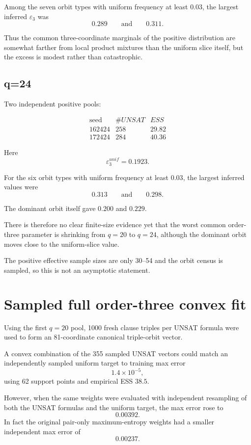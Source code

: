 \documentclass[11pt]{article}
\begin{document}
Among the seven orbit types with uniform frequency at least \(0.03\), the
largest inferred \(\varepsilon_3\) was
\[
0.289
\qquad\text{and}\qquad
0.311.
\]

Thus the common three-coordinate marginals of the positive distribution are
somewhat farther from local product mixtures than the uniform slice itself,
but the excess is modest rather than catastrophic.

\subsection*{q=24}

Two independent positive pools:

\[
\begin{array}{c|c|c}
\text{seed}&\#UNSAT&ESS\\
\hline
162424&258&29.82\\
172424&284&40.36
\end{array}
\]

Here
\[
\varepsilon^{unif}_3=0.1923.
\]

For the six orbit types with uniform frequency at least \(0.03\), the largest
inferred values were
\[
0.313
\qquad\text{and}\qquad
0.298.
\]

The dominant orbit itself gave \(0.200\) and \(0.229\).

There is therefore no clear finite-size evidence yet that the worst common
order-three parameter is shrinking from \(q=20\) to \(q=24\), although the
dominant orbit moves close to the uniform-slice value.

The positive effective sample sizes are only 30--54 and the orbit census is
sampled, so this is not an asymptotic statement.

\section{Sampled full order-three convex fit}

Using the first \(q=20\) pool, 1000 fresh clause triples per UNSAT formula were
used to form an 81-coordinate canonical triple-orbit vector.

A convex combination of the 355 sampled UNSAT vectors could match an
independently sampled uniform target to training max error
\[
1.4\times10^{-5},
\]
using 62 support points and empirical ESS \(38.5\).

However, when the same weights were evaluated with independent resampling of
both the UNSAT formulas and the uniform target, the max error rose to
\[
0.00392.
\]
In fact the original pair-only maximum-entropy weights had a smaller
independent max error of
\[
0.00237.
\]
\end{document}
